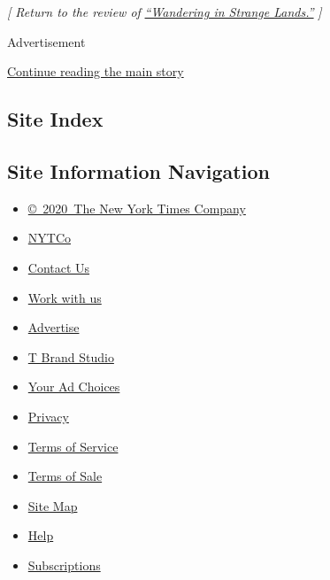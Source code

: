 \emph{{[} Return to the review of}
\href{https://www.nytimes.com/2020/08/03/books/review/wandering-in-strange-lands-morgan-jerkins.html}{\emph{``Wandering
in Strange Lands.''}} \emph{{]}}

Advertisement

\protect\hyperlink{after-bottom}{Continue reading the main story}

\hypertarget{site-index}{%
\subsection{Site Index}\label{site-index}}

\hypertarget{site-information-navigation}{%
\subsection{Site Information
Navigation}\label{site-information-navigation}}

\begin{itemize}
\tightlist
\item
  \href{https://help.nytimes.com/hc/en-us/articles/115014792127-Copyright-notice}{©~2020~The
  New York Times Company}
\end{itemize}

\begin{itemize}
\tightlist
\item
  \href{https://www.nytco.com/}{NYTCo}
\item
  \href{https://help.nytimes.com/hc/en-us/articles/115015385887-Contact-Us}{Contact
  Us}
\item
  \href{https://www.nytco.com/careers/}{Work with us}
\item
  \href{https://nytmediakit.com/}{Advertise}
\item
  \href{http://www.tbrandstudio.com/}{T Brand Studio}
\item
  \href{https://www.nytimes.com/privacy/cookie-policy\#how-do-i-manage-trackers}{Your
  Ad Choices}
\item
  \href{https://www.nytimes.com/privacy}{Privacy}
\item
  \href{https://help.nytimes.com/hc/en-us/articles/115014893428-Terms-of-service}{Terms
  of Service}
\item
  \href{https://help.nytimes.com/hc/en-us/articles/115014893968-Terms-of-sale}{Terms
  of Sale}
\item
  \href{https://spiderbites.nytimes.com}{Site Map}
\item
  \href{https://help.nytimes.com/hc/en-us}{Help}
\item
  \href{https://www.nytimes.com/subscription?campaignId=37WXW}{Subscriptions}
\end{itemize}
